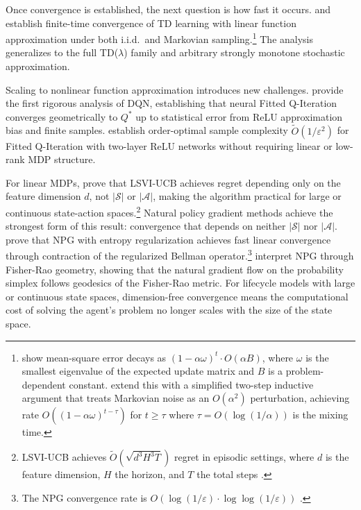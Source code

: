 Once convergence is established, the next question is how fast it occurs. \citet{bhandari2021finite} and \citet{mitra2024} establish finite-time convergence of TD learning with linear function approximation under both i.i.d.\ and Markovian sampling.\footnote{\citet{bhandari2021finite} show mean-square error decays as $(1 - \alpha\omega)^t \cdot O(\alpha B)$, where $\omega$ is the smallest eigenvalue of the expected update matrix and $B$ is a problem-dependent constant. \citet{mitra2024} extend this with a simplified two-step inductive argument that treats Markovian noise as an $O(\alpha^2)$ perturbation, achieving rate $O((1-\alpha\omega)^{t-\tau})$ for $t \geq \tau$ where $\tau = O(\log(1/\alpha))$ is the mixing time.} The analysis generalizes to the full TD($\lambda$) family and arbitrary strongly monotone stochastic approximation.

Scaling to nonlinear function approximation introduces new challenges. \citet{fan2020dqn} provide the first rigorous analysis of DQN, establishing that neural Fitted Q-Iteration converges geometrically to $Q^*$ up to statistical error from ReLU approximation bias and finite samples. \citet{gaur2023fqi} establish order-optimal sample complexity $\tilde{O}(1/\varepsilon^2)$ for Fitted Q-Iteration with two-layer ReLU networks without requiring linear or low-rank MDP structure.

For linear MDPs, \citet{jin2020} prove that LSVI-UCB achieves regret depending only on the feature dimension $d$, not $|\mathcal{S}|$ or $|\mathcal{A}|$, making the algorithm practical for large or continuous state-action spaces.\footnote{LSVI-UCB achieves $\tilde{O}(\sqrt{d^3 H^3 T})$ regret in episodic settings, where $d$ is the feature dimension, $H$ the horizon, and $T$ the total steps \citep{jin2020}.} Natural policy gradient methods achieve the strongest form of this result: convergence that depends on neither $|\mathcal{S}|$ nor $|\mathcal{A}|$. \citet{cen2022fast} prove that NPG with entropy regularization achieves fast linear convergence through contraction of the regularized Bellman operator.\footnote{The NPG convergence rate is $O(\log(1/\varepsilon) \cdot \log\log(1/\varepsilon))$ \citep{cen2022fast}.} \citet{muller2024npg} interpret NPG through Fisher-Rao geometry, showing that the natural gradient flow on the probability simplex follows geodesics of the Fisher-Rao metric. For lifecycle models with large or continuous state spaces, dimension-free convergence means the computational cost of solving the agent's problem no longer scales with the size of the state space.

